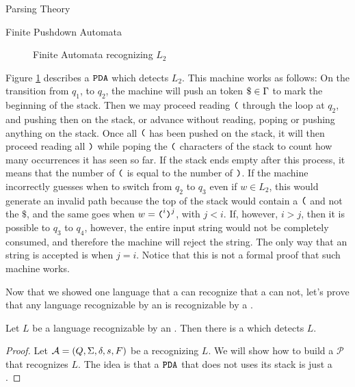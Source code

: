 \begin{section}{Parsing Theory}
\begin{subsection}{Finite Pushdown Automata}
\begin{figure}

\caption{Finite Automata recognizing $L_2$}
\label{fig:pda_l2}
\end{figure}

Figure \ref{fig:pda_l2} describes a $\texttt{PDA}$ which detects $L_2$.
This machine works as follows: On the transition
from $q_1$, to $q_2$, the machine will push an token $\$ \in \Gamma$ to mark the
beginning of the stack. Then we may proceed reading $\texttt{(}$ through the loop
at $q_2$, and pushing then on the stack, or advance without reading, poping or
pushing anything on the stack.  Once all $\texttt{(}$ has been pushed on the
stack, it will then proceed reading all $\texttt{)}$ while poping the $\texttt{(}$
characters of the stack to count how many occurrences it has seen so far.
If the stack ends empty after this process, it means that the number of $\texttt{(}$
is equal to the number of $\texttt{)}$. If the machine incorrectly guesses when to switch
from $q_2$ to $q_3$ even if $w \in L_2$, this would generate an invalid path
because the top of the stack would contain a $\texttt{(}$ and not the $\$$, and
the same goes when $w = \texttt{(}^i\texttt{)}^j$, with $j < i$. If, however, $i >
j$, then it is possible to $q_3$ to $q_4$, however, the entire input string
would not be completely consumed, and therefore the machine will reject the
string. The only way that an string is accepted is when $j = i$. Notice that
this is not a formal proof that such machine works.

Now that we showed one language that a  can recognize that a
 can not, let's prove that any language recognizable by an
 is recognizable by a .

\begin{theorem}
Let $L$ be a language recognizable by an . Then there is a 
which detects $L$.
\end{theorem}
\begin{proof}
	Let $\mathcal{A} = (Q, \Sigma, \delta, s, F)$ be a  recognizing $L$.
We will show how to build a  $\mathcal{P}$ that recognizes $L$.
The idea is that a $\texttt{PDA}$ that does not uses its stack is just a .


\end{proof}
\end{subsection}
\end{section}
